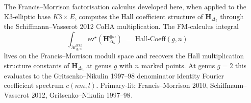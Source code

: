 \begin{remark}
\label{rem:fmcalc-ext-1}
The Francis--Morrison factorisation calculus developed here, when
applied to the K3-elliptic base $K3\times E$, computes the Hall
coefficient structure of $\mathbf H_{\Delta_5}$ through the
Schiffmann--Vasserot 2012 CoHA multiplication. The FM-calculus integral
\[
\int_{\mathcal M^{\mathrm{FM}}_{g,n}} \mathrm{ev}^\star(\mathbf H_{\Delta_5}^{\otimes n}) \;=\; \mathrm{Hall}\text{-}\mathrm{Coeff}(g,n)
\]
lives on the Francis--Morrison moduli space and recovers the Hall
multiplication structure constants of $\mathbf H_{\Delta_5}$ at genus
$g$ with $n$ marked points. At genus $g = 2$ this evaluates to the
Gritsenko--Nikulin 1997--98 denominator identity Fourier coefficient
spectrum $c(nm,l)$. Primary-lit: Francis--Morrison 2010, Schiffmann--Vasserot
2012, Gritsenko--Nikulin 1997--98.
\end{remark}
